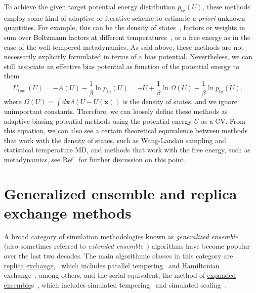 \documentclass[9pt,review]{livecoms}
\newcommand{\vx}{\mathbf{x}}
\begin{document}
To achieve the given target potential energy distribution $p_{\mathrm{tg}}(U)$, these methods employ some kind of adaptive or iterative scheme to estimate \textit{a priori} unknown quantities. For example, this can be the density of states~\cite{wang-landau:prl:2001:wang-landau,Kim2006_PRL_STMD,DePablo_DOS_2012}, factors or weights in sum over Boltzmann factors at different temperatures~\cite{Gao_ITS_2008,invernizzi2020unified}, or a free energy as in the case of the well-tempered metadynamics. As said above, these methods are not necessarily explicitly formulated in terms of a bias potential. Nevertheless, we can still associate an effective bias potential as function of the potential energy to them
\begin{equation}
U_\mathrm{bias}(U) = - A(U) -\frac{1}{\beta} \ln p_{\mathrm{tg}}(U) = - U + \frac{1}{\beta} \ln \Omega(U) -\frac{1}{\beta} \ln p_{\mathrm{tg}}(U),
\end{equation}
where $\Omega(U) = \int d\vx \, \delta(U-U(\vx))$ is the density of states, and we ignore unimportant constants. Therefore, we can loosely define these methods as adaptive biasing potential methods using the potential energy $U$ as a CV. From this equation, we can also see a certain theoretical equivalence between methods that work with the density of states, such as Wang-Landau sampling and statistical temperature MD, and methods that work with the free energy, such as metadynamics, see Ref~\cite{Junghans2014wte-wl} for further discussion on this point.

\section{Generalized ensemble and replica exchange methods}
\label{sec:generalized-ensemble}

A broad category of simulation methodologies known as \emph{generalized ensemble}~\cite{okamoto:biopolymers:2001:generalized-ensemble} (also sometimes referred to \emph{extended ensemble}~\cite{iba:intl-j-mod-phys-c:2001:extended-ensemble}) algorithms have become popular over the last two decades.
The main  algorithmic classes in this category are \hyperlink{ref:ReplEx} {replica exchange},~\cite{geyer:conference-proceedings:1991:replica-exchange} which includes parallel tempering~\cite{hukushima-nemoto:j-phys-soc-jpn:1996:parallel-tempering,hansmann:chem-phys-lett:1997:parallel-tempering-monte-carlo,sugita-okamoto:chem-phys-lett:1999:parallel-tempering-md} and Hamiltonian exchange~\cite{sugita-kitao-okamoto:jcp:2000:hamiltonian-exchange,fukunishi-watanabe-takada:jcp:2002:hamiltonian-exchange,jang-shin-pak:prl:2003:hamiltonian-exchange,kwak-hansmann:prl:2005:hamiltonian-exchange}, among others, and the serial equivalent, the method of \hyperlink{ref:ExpEns} {expanded ensemble}s~\cite{lyubartsev:jcp:1992:expanded-ensembles}, which includes simulated tempering~\cite{marinari-parisi:europhys-lett:1992:simulated-tempering,geyer-thompson:j-am-stat-assoc:1995:expanded-ensembles} and simulated scaling~\cite{li-fajer-yang:jcp:2007:simulated-scaling}.
\end{document}
